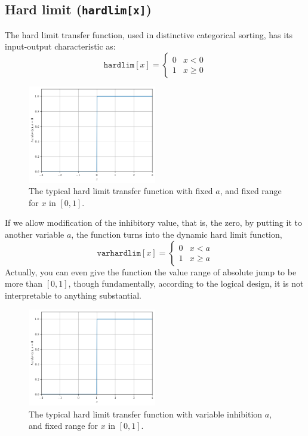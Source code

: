 \subsection{Hard limit (\texttt{hardlim[x]})}
The hard limit transfer function, used in distinctive categorical sorting, has its input-output characteristic as: 
\begin{equation}
    \texttt{hardlim}[x] = \begin{cases}
        0 & x < 0\\
        1 & x \geq 0
    \end{cases}
\end{equation}
\begin{figure}[h!]
    \centering
    \includegraphics[width=0.5\textwidth]{img/hardlim1.png}
    \caption{The typical hard limit transfer function with fixed $a$, and fixed range for $x$ in $[0,1]$.}
\end{figure}
If we allow modification of the inhibitory value, that is, the zero, by putting it to another variable $a$, the function turns into the dynamic hard limit function, 
\begin{equation}
    \texttt{varhardlim}[x] = \begin{cases}
        0 & x < a\\
        1 & x \geq a
    \end{cases}
\end{equation}
Actually, you can even give the function the value range of absolute jump to be more than $[0,1]$, though fundamentally, according to the logical design, it is not interpretable to anything substantial. 
\begin{figure}[h!]
    \centering
    \includegraphics[width=0.5\textwidth]{img/hardlim3.png}
    \caption{The typical hard limit transfer function with variable inhibition $a$, and fixed range for $x$ in $[0,1]$.}
\end{figure}
